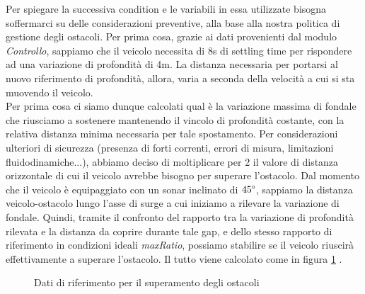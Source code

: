 \documentclass{article}
\begin{document}
            Per spiegare la successiva condition e le variabili in essa utilizzate bisogna soffermarci su delle considerazioni preventive, alla base alla nostra politica di gestione
            degli ostacoli. Per prima cosa, grazie ai dati provenienti dal modulo \textit{Controllo}, sappiamo che il veicolo necessita di 8s di settling time per rispondere
            ad una variazione di profondità di 4m. La distanza necessaria per portarsi al nuovo riferimento di profondità, allora, varia a
            seconda della velocità a cui si sta muovendo il veicolo. \\
            Per prima cosa ci siamo dunque calcolati qual è la variazione massima di fondale che riusciamo a sostenere mantenendo il vincolo di profondità costante, con la 
            relativa distanza minima necessaria per tale spostamento. 
            Per considerazioni ulteriori di sicurezza (presenza di forti correnti, errori di misura, limitazioni fluidodinamiche...), abbiamo deciso 
            di moltiplicare per 2 il valore di distanza orizzontale di cui il veicolo avrebbe bisogno per superare l'ostacolo. Dal momento che il veicolo è equipaggiato
            con un sonar inclinato di $45\degree$, sappiamo la
            distanza veicolo-ostacolo lungo l'asse di surge a cui iniziamo a rilevare la variazione di fondale. Quindi, tramite il confronto del rapporto tra la
            variazione di profondità rilevata e la distanza da coprire durante tale gap, e dello stesso rapporto di riferimento in condizioni ideali \emph{maxRatio}, possiamo
            stabilire se il veicolo riuscirà effettivamente a superare l'ostacolo. Il tutto viene calcolato come in figura \ref{fig:consid} .

            \begin{figure} [ht]
                \caption{Dati di riferimento per il superamento degli ostacoli}
                \label{fig:consid}
            \end{figure}
\end{document}
